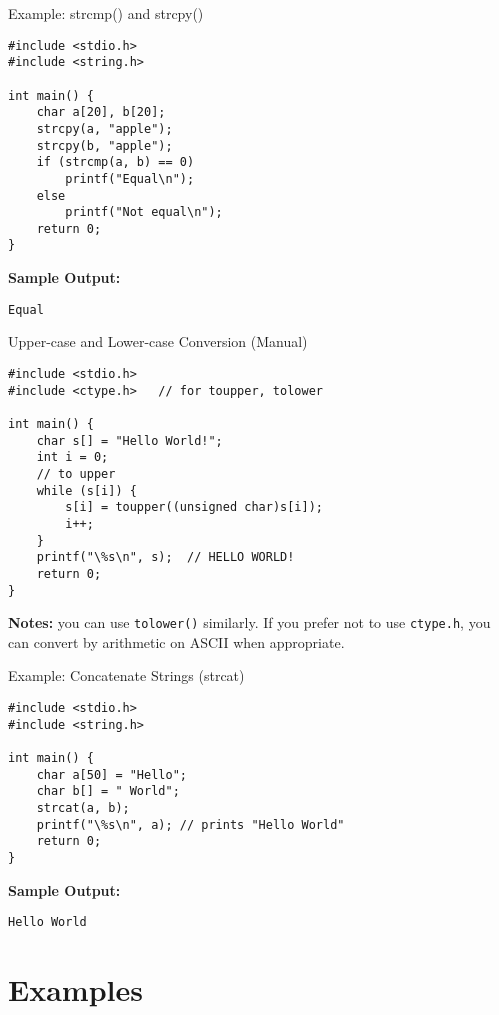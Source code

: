 \documentclass[12pt, aspectratio=169]{beamer}
\begin{document}
    \begin{frame}[fragile]{Example: strcmp() and strcpy()}
        \begin{verbatim}
#include <stdio.h>
#include <string.h>

int main() {
    char a[20], b[20];
    strcpy(a, "apple");
    strcpy(b, "apple");
    if (strcmp(a, b) == 0)
        printf("Equal\n");
    else
        printf("Not equal\n");
    return 0;
}
        \end{verbatim}

        \textbf{Sample Output:}
        \begin{verbatim}
Equal
        \end{verbatim}
    \end{frame}

    \begin{frame}[fragile]{Upper-case and Lower-case Conversion (Manual)}
        \begin{verbatim}
#include <stdio.h>
#include <ctype.h>   // for toupper, tolower

int main() {
    char s[] = "Hello World!";
    int i = 0;
    // to upper
    while (s[i]) {
        s[i] = toupper((unsigned char)s[i]);
        i++;
    }
    printf("\%s\n", s);  // HELLO WORLD!
    return 0;
}
        \end{verbatim}

        \textbf{Notes:} you can use \texttt{tolower()} similarly. If you prefer not to use \texttt{ctype.h}, you can convert by arithmetic on ASCII when appropriate.
    \end{frame}

    \begin{frame}[fragile]{Example: Concatenate Strings (strcat)}
        \begin{verbatim}
#include <stdio.h>
#include <string.h>

int main() {
    char a[50] = "Hello";
    char b[] = " World";
    strcat(a, b);
    printf("\%s\n", a); // prints "Hello World"
    return 0;
}
        \end{verbatim}

        \textbf{Sample Output:}
        \begin{verbatim}
Hello World
        \end{verbatim}
    \end{frame}


    \section{Examples}
\end{document}
